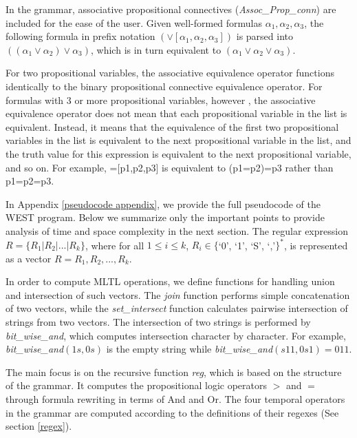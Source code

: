 \documentclass[runningheads]{llncs}
\begin{document}
In the grammar, associative propositional connectives (\textit{Assoc\_Prop\_conn}) are included for the ease of the user. Given well-formed formulas $\alpha_1, \alpha_2, \alpha_3$, the following formula in prefix notation $(\lor[\alpha_1, \alpha_2, \alpha_3])$ is parsed into $((\alpha_1 \lor \alpha_2) \lor \alpha_3)$, which is in turn equivalent to $(\alpha_1 \lor \alpha_2 \lor \alpha_3)$. \\
\begin{remark}
For two propositional variables, the associative equivalence operator functions identically to the binary propositional connective equivalence operator. For formulas with 3 or more propositional variables, however , the associative equivalence operator does not mean that each propositional variable in the list is equivalent. Instead, it means that the equivalence of the first two propositional variables in the list is equivalent to the next propositional variable in the list, and the truth value for this expression is equivalent to the next propositional variable, and so on. For example, =[p1,p2,p3] is equivalent to (p1=p2)=p3 rather than p1=p2=p3.
\end{remark}

In Appendix \ref{pseudocode appendix}, we provide the full pseudocode of the WEST program. Below we summarize only the important points to provide analysis of time and space complexity in the next section. The regular expression $R = \{R_1 | R_2 | ... | R_k\}$, where for all $1 \leq i \leq k$, $R_i \in \{$`0', `1', `S', `,'$\}^*$, is represented as a vector $R = {R_1, R_2, ..., R_k}$.

In order to compute MLTL operations, we define functions for handling union and intersection of such vectors. 
The \textit{join} function performs simple concatenation of two vectors, while the \textit{set\_intersect} function calculates pairwise intersection of strings from two vectors.
The intersection of two strings is performed by \textit{bit\_wise\_and}, which computes intersection character by character.
For example, \textit{bit\_wise\_and}$(1s, 0s)$ is the empty string while \textit{bit\_wise\_and}$(s11, 0s1) = 011$. 

The main focus is on the recursive function \textit{reg}, which is based on the structure of the grammar. It computes the propositional logic operators $>$ and  $=$ through formula rewriting in terms of And and Or. The four temporal operators in the grammar are computed according to the definitions of their regexes (See section \ref{regex}).
\end{document}
